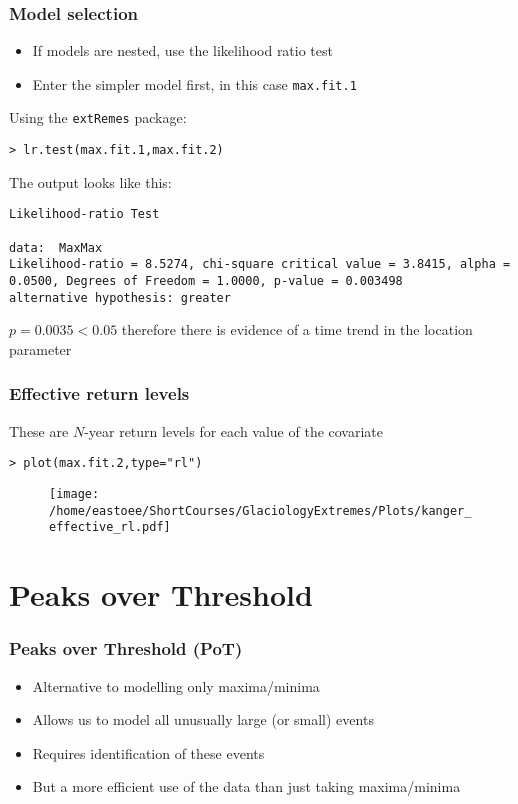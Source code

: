 \documentclass[dvipsnames]{beamer}
\begin{document}
\begin{frame}[fragile]
\frametitle{Model selection}
\begin{itemize}
\item
If models are nested, use the likelihood ratio test
\item
Enter the simpler model first, in this case \texttt{max.fit.1}
\end{itemize}
Using the \texttt{extRemes} package:

\begin{verbatim}
> lr.test(max.fit.1,max.fit.2)
\end{verbatim}

The output looks like this:
\begin{verbatim}
Likelihood-ratio Test

data:  MaxMax
Likelihood-ratio = 8.5274, chi-square critical value = 3.8415, alpha =
0.0500, Degrees of Freedom = 1.0000, p-value = 0.003498
alternative hypothesis: greater
\end{verbatim}
$p=0.0035<0.05$ therefore there is evidence of a time trend in the location parameter
\end{frame}

\begin{frame}[fragile]
\frametitle{Effective return levels}
These are $N$-year return levels for each value of the covariate 
\begin{verbatim}
> plot(max.fit.2,type="rl")
\end{verbatim}
\begin{figure}
\centering
{\texttt{[image: /home/eastoee/ShortCourses/GlaciologyExtremes/Plots/kanger\_effective\_rl.pdf]}}
\end{figure}
\end{frame}


\section{Peaks over Threshold}

\begin{frame}
\frametitle{Peaks over Threshold (PoT)}
\begin{itemize}
\item
Alternative to modelling only maxima/minima
\item
Allows us to model all unusually large (or small) events
\item
Requires identification of these events
\item
But a more efficient use of the data than just taking maxima/minima
\end{itemize}
\end{frame}
\end{document}
